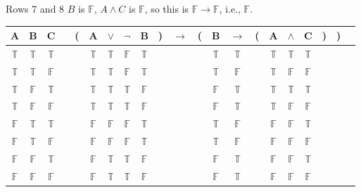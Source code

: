 \documentclass[
  ignorenonframetext,
]{beamer}
\renewcommand{\,}{\text{, }}
\def\True{\mathbb{T}}
\def\False{\mathbb{F}}
\begin{document}
\begin{frame}{Rows 7 and 8}
\protect\hypertarget{rows-7-and-8}{}
\(B\) is \(\False\), \(A \wedge C\) is \(\False\), so this is
\(\False \rightarrow \False\), i.e., \(\False\).

\begin{center}

\begin{tabular}{@{ }c@{ }@{ }c@{ }@{ }c | c@{ }@{}c@{}@{ }c@{ }@{ }c@{ }@{ }c@{ }@{ }c@{ }@{}c@{}@{ }c@{ }@{}c@{}@{ }c@{ }@{ }c@{ }@{}c@{}@{ }c@{ }@{ }c@{ }@{ }c@{ }@{}c@{}@{}c@{}@{ }c}
A & B & C &  & ( & A & $\vee$ & $\neg$ & B & ) & $\rightarrow$ & ( & B & $\rightarrow$ & ( & A & $\wedge$ & C & ) & ) & \\
\hline 
 $\True$ & $\True$ & $\True$ &  &  & $\True$ & $\True$ & $\False$ & $\True$ &  &&  & $\True$ & $\True$ &  & $\True$ & $\True$ & $\True$ &  &  & \\
 $\True$ & $\True$ & $\False$ &  &  & $\True$ & $\True$ & $\False$ & $\True$ &  &&  & $\True$ & $\False$ &  & $\True$ & $\False$ & $\False$ &  &  & \\
 $\True$ & $\False$ & $\True$ &  &  & $\True$ & $\True$ & $\True$ & $\False$ &  &&  & $\False$ & $\True$ &  & $\True$ & $\True$ & $\True$ &  &  & \\
 $\True$ & $\False$ & $\False$ &  &  & $\True$ & $\True$ & $\True$ & $\False$ &  &&  & $\False$ & $\True$ &  & $\True$ & $\False$ & $\False$ &  &  & \\
 $\False$ & $\True$ & $\True$ &  &  & $\False$ & $\False$ & $\False$ & $\True$ &  &&  & $\True$ & $\False$ &  & $\False$ & $\False$ & $\True$ &  &  & \\
 $\False$ & $\True$ & $\False$ &  &  & $\False$ & $\False$ & $\False$ & $\True$ &  &&  & $\True$ & $\False$ &  & $\False$ & $\False$ & $\False$ &  &  & \\
 $\False$ & $\False$ & $\True$ &  &  & $\False$ & $\True$ & $\True$ & $\False$ &  &&  & $\False$ & $\True$ &  & $\False$ & $\False$ & $\True$ &  &  & \\
 $\False$ & $\False$ & $\False$ &  &  & $\False$ & $\True$ & $\True$ & $\False$ &  &&  & $\False$ & $\True$ &  & $\False$ & $\False$ & $\False$ &  &  & \\
\end{tabular}

\end{center}
\end{frame}
\end{document}
